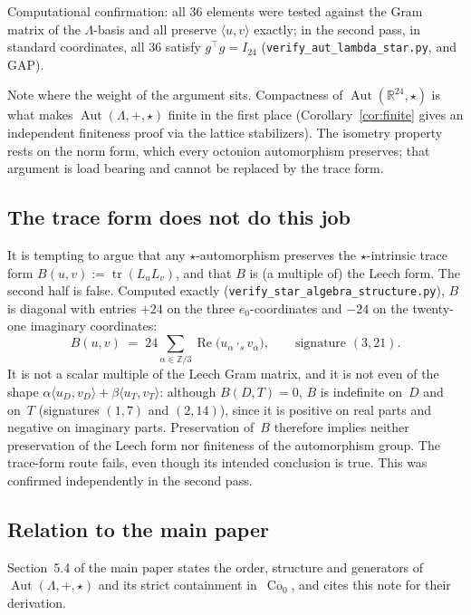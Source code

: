\documentclass[11pt]{amsart}
\newcommand{\LL}{\Lambda}
\newcommand{\ZZ}{\mathbb{Z}}
\newcommand{\RR}{\mathbb{R}}
\newcommand{\ip}[2]{\langle #1, #2 \rangle}
\DeclareMathOperator{\Aut}{Aut}
\DeclareMathOperator{\Co}{Co}
\DeclareMathOperator{\Tr}{tr}
\DeclareMathOperator{\Rea}{Re}
\theoremstyle{definition}
\theoremstyle{remark}
\begin{document}
Computational confirmation: all $36$ elements were tested against the Gram
matrix of the $\LL$-basis and all preserve $\ip{u}{v}$ exactly; in the second
pass, in standard coordinates, all $36$ satisfy $g^{\!\top} g = I_{24}$
(\texttt{verify\_aut\_lambda\_star.py}, and GAP).

Note where the weight of the argument sits. Compactness of
$\Aut(\RR^{24},\star)$ is what makes $\Aut(\LL,+,\star)$ finite in the first
place (Corollary~\ref{cor:finite} gives an independent finiteness proof via the
lattice stabilizers). The isometry property rests on the norm form, which every
octonion automorphism preserves; that argument is load bearing and cannot be
replaced by the trace form.

\subsection{The trace form does not do this job}

It is tempting to argue that any $\star$-automorphism preserves the
$\star$-intrinsic trace form
$B(u,v) := \Tr(L_u L_v)$, and that $B$ is (a multiple of) the Leech form.
The second half is false. Computed exactly
(\texttt{verify\_star\_algebra\_structure.py}), $B$ is diagonal with entries
$+24$ on the three $e_0$-coordinates and $-24$ on the twenty-one imaginary
coordinates:
\[
  B(u,v) \;=\; 24 \sum_{\alpha \in \ZZ/3} \Rea\bigl(u_\alpha \cdot_s v_\alpha\bigr),
  \qquad \text{signature } (3, 21).
\]
It is not a scalar multiple of the Leech Gram matrix, and it is not even of the
shape $\alpha \ip{u_D}{v_D} + \beta \ip{u_T}{v_T}$: although $B(D, T) = 0$,
$B$ is indefinite on~$D$ and on~$T$ (signatures $(1,7)$ and $(2,14)$), since it
is positive on real parts and negative on imaginary parts. Preservation of~$B$
therefore implies neither preservation of the Leech form nor finiteness of the
automorphism group. The trace-form route fails, even though its intended
conclusion is true. This was confirmed independently in the second pass.

\subsection{Relation to the main paper}
\label{sec:main-paper}

Section~5.4 of the main paper states the order, structure and generators of
$\Aut(\LL,+,\star)$ and its strict containment in~$\Co_0$, and cites this note
for their derivation.
\end{document}

